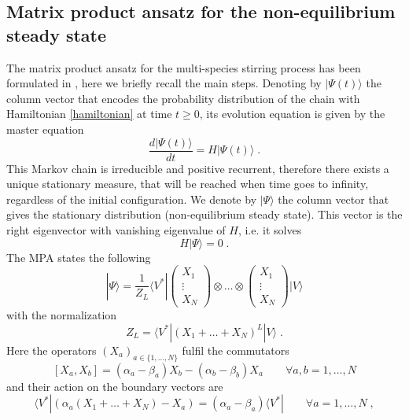 \documentclass[10pt]{article}
\numberwithin{equation}{section}
\numberwithin{equation}{subsection}
\newcommand{\co}{\;,}
\newcommand{\dt}{\;.}
\begin{document}
\subsection{Matrix product ansatz for the non-equilibrium steady state}
The matrix product ansatz for the multi-species stirring process has been formulated in \cite{vanicat2017exact}, here we briefly recall the main steps.
 Denoting by $|\Psi(t)\rangle$ the column vector that encodes the probability distribution of the chain with Hamiltonian \eqref{hamiltonian} at time $t\geq 0$, its evolution equation is given by 
 the master equation
\begin{equation}
    \frac{d|{\Psi}(t)\rangle}{dt}=H|{\Psi}(t)\rangle\dt
\end{equation}
This Markov chain is irreducible and positive recurrent, therefore there exists a unique stationary measure, that will be reached when time goes to infinity, regardless of the initial configuration. 
We denote by $|\Psi\rangle$ the column vector that gives the stationary distribution (non-equilibrium steady state). This vector is the right eigenvector with vanishing eigenvalue of $H$, i.e. it solves 
\begin{equation}\label{definition-SteadyStateH}
	H|\Psi\rangle =0\dt
\end{equation}
The MPA states the following
\begin{equation}
	|\Psi\rangle=\frac{1}{Z_{L}}\langle V^{*}|\begin{pmatrix}
		X_{1}\\
		\vdots\\
		X_{N}
	\end{pmatrix}\otimes \ldots\otimes \begin{pmatrix}
		X_{1}\\
		\vdots\\
		X_{N}
	\end{pmatrix}|V\rangle
\end{equation}
with the normalization 
\begin{equation}
	Z_{L}=\langle V^{*}|(X_{1}+\ldots +X_{N})^{L}|V\rangle\dt
\end{equation}
Here the operators $(X_{a})_{a\in \{1,\ldots,N\}}$ fulfil the commutators
\begin{equation}\label{bulk}
	\left[X_{a},X_{b}\right]=(\alpha_{a}-\beta_{a})X_{b}-(\alpha_{b}-\beta_{b})X_{a}\qquad\forall a,b=1,\ldots,N
\end{equation}
and their action on the boundary vectors are
\begin{equation}\label{leftBoundary}
	\langle V^{*}|\left(\alpha_{a}(X_{1}+\ldots+X_{N})-X_{a}\right)=(\alpha_{a}-\beta_{a})\langle V^{*}|\qquad\forall a=1,\ldots,N\co
\end{equation}
\end{document}

